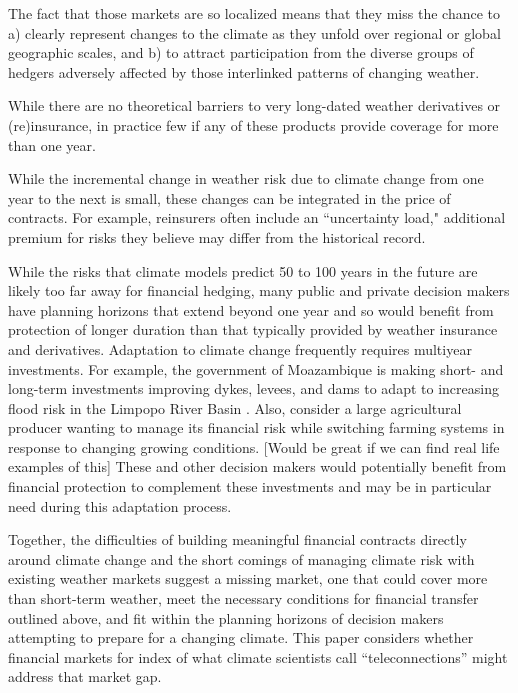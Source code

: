 \documentclass[authoryear]{article}
\begin{document}
The fact that those markets are so localized means that they miss the chance to a) clearly represent changes to the climate as they unfold over regional or global geographic scales, and b) to attract participation from the diverse groups of hedgers adversely affected by those interlinked patterns of changing weather.

\begin{comment}
Next section is similar to the previous on the time horizon problems for direct climate hedging.
My inclination is to cut it because it is not really a problem per se for weather, since the risk itself is short-term
\end{comment}
While there are no theoretical barriers to very long-dated weather derivatives or (re)insurance, in practice few if any of these products provide coverage for more than one year.
\begin{comment}
Weather derivatives could easily extend beyond a year, but generally don't.
\end{comment}
While the incremental change in weather risk due to climate change from one year to the next is small, these changes can be integrated in the price of contracts. For example, reinsurers often include an ``uncertainty load," additional premium for risks they believe may differ from the historical record.

While the risks that climate models predict 50 to 100 years in the future are likely too far away for financial hedging, many public and private decision makers have planning horizons that extend beyond one year and so would benefit from protection of longer duration than that typically provided by weather insurance and derivatives. Adaptation to climate change frequently requires multiyear investments. For example, the government of Moazambique is making short- and long-term investments improving dykes, levees, and dams to adapt to increasing flood risk in the Limpopo River Basin \citep{worldBank2013limpopo}. Also, consider a large agricultural producer wanting to manage its financial risk while switching farming systems in response to changing growing conditions. [Would be great if we can find real life examples of this] These and other decision makers would potentially benefit from financial protection to complement these investments and may be in particular need during this adaptation process.

Together, the difficulties of building meaningful financial contracts directly around climate change and the short comings of managing climate risk with existing weather markets suggest a missing market, one that could cover more than short-term weather, meet the necessary conditions for financial transfer outlined above, and fit within the planning horizons of decision makers attempting to prepare for a changing climate. This paper considers whether financial markets for index of what climate scientists call ``teleconnections'' might address that market gap.
\end{document}
